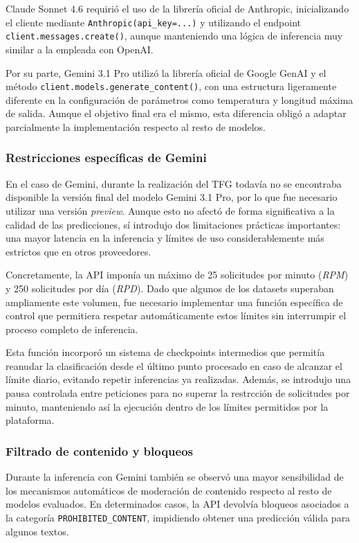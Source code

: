 Claude Sonnet 4.6 requirió el uso de la librería oficial de Anthropic, inicializando el cliente mediante \texttt{Anthropic(api\_key=...)} y utilizando el endpoint \texttt{client.messages.create()}, aunque manteniendo una lógica de inferencia muy similar a la empleada con OpenAI.

Por su parte, Gemini 3.1 Pro utilizó la librería oficial de Google GenAI y el método \texttt{client.models.generate\_content()}, con una estructura ligeramente diferente en la configuración de parámetros como temperatura y longitud máxima de salida. Aunque el objetivo final era el mismo, esta diferencia obligó a adaptar parcialmente la implementación respecto al resto de modelos.

\subsubsection{Restricciones específicas de Gemini}

En el caso de Gemini, durante la realización del TFG todavía no se encontraba disponible la versión final del modelo Gemini 3.1 Pro, por lo que fue necesario utilizar una versión \textit{preview}. Aunque esto no afectó de forma significativa a la calidad de las predicciones, sí introdujo dos limitaciones prácticas importantes: una mayor latencia en la inferencia y límites de uso considerablemente más estrictos que en otros proveedores.

Concretamente, la API imponía un máximo de 25 solicitudes por minuto (\textit{RPM}) y 250 solicitudes por día (\textit{RPD}). Dado que algunos de los datasets superaban ampliamente este volumen, fue necesario implementar una función específica de control que permitiera respetar automáticamente estos límites sin interrumpir el proceso completo de inferencia.

Esta función incorporó un sistema de checkpoints intermedios que permitía reanudar la clasificación desde el último punto procesado en caso de alcanzar el límite diario, evitando repetir inferencias ya realizadas. Además, se introdujo una pausa controlada entre peticiones para no superar la restrcción de solicitudes por minuto, manteniendo así la ejecución dentro de los límites permitidos por la plataforma.

\subsubsection{Filtrado de contenido y bloqueos}

Durante la inferencia con Gemini también se observó una mayor sensibilidad de los mecanismos automáticos de moderación de contenido respecto al resto de modelos evaluados. En determinados casos, la API devolvía bloqueos asociados a la categoría \texttt{PROHIBITED\_CONTENT}, impidiendo obtener una predicción válida para algunos textos.

